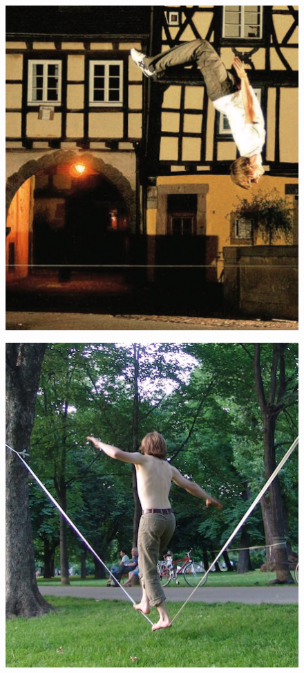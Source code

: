 \begin{figure}[htb]
\begin{minipage}[t]{0.45\linewidth}
		\includegraphics[width=1\linewidth]{Pictures/3_1_jumpline}
		\label{fig:jumpline}
	\end{minipage}
	\hfill
	\begin{minipage}[t]{0.45\linewidth}
		\centering
		\includegraphics[width=1\linewidth]{Pictures/3_1_rodeoline}

\end{minipage}
\end{figure}
